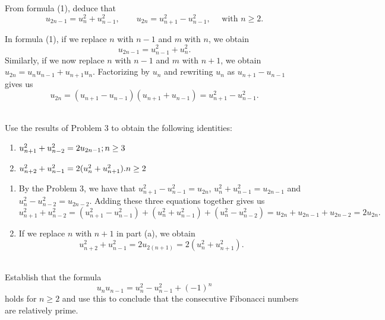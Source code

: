 \begin{exercise}
    From formula (1), deduce that
    $$u_{2n - 1} = u_n^2 + u_{n-1}^2, \qquad u_{2n} = u_{n+1}^2 - u_{n-1}^2, \quad \text{ with } n\geq 2.$$
\end{exercise}

\begin{solution}
    In formula (1), if we replace $n$ with $n-1$ and $m$ with $n$, we obtain 
    $$u_{2n - 1} = u_{n-1}^2 + u_n^2.$$
    Similarly, if we now replace $n$ with $n - 1$ and $m$ with $n +1$, we obtain
    $u_{2n} = u_nu_{n-1} + u_{n + 1}u_n$. Factorizing by $u_n$ and rewriting $u_n$ as $u_{n+1} - u_{n-1}$ gives us
    $$u_{2n} = (u_{n+1} - u_{n-1})(u_{n+1} + u_{n-1}) = u_{n+1}^2 - u_{n-1}^2.$$ \\
\end{solution}

\begin{exercise}
    Use the results of Problem 3 to obtain the following identities:
    \begin{enumerate}
        \item $u_{n+1}^2 + u_{n-2}^2 = 2u_{2n-1}; \hfill n \geq 3$
        \item $u_{n+2}^2 + u_{n-1}^2 = 2(u_n^2 + u_{n+1}^2). \hfill n \geq 2$\\
    \end{enumerate} 
\end{exercise}

\begin{solution}
    \begin{enumerate}
        \item By the Problem 3, we have that $u_{n+1}^2 - u_{n-1}^2 = u_{2n}$, $u_n^2 + u_{n-1}^2 = u_{2n-1}$ and $u_n^2 - u_{n-2}^2 = u_{2n-2}$. Adding these three equations together gives us
        $$u_{n+1}^2 + u_{n-2}^2 = (u_{n+1}^2 - u_{n-1}^2) + (u_n^2 + u_{n-1}^2) + (u_n^2 - u_{n-2}^2) = u_{2n} + u_{2n-1} + u_{2n-2} = 2u_{2n}.$$
        \item If we replace $n$ with $n + 1$ in part (a), we obtain
        $$u_{n+2}^2 + u_{n-1}^2 = 2u_{2(n+1)} = 2(u_n^2 + u_{n+1}^2).$$ \\
    \end{enumerate}
\end{solution}

\begin{exercise}
    Establish that the formula
    $$u_nu_{n-1} = u_n^2 - u_{n-1}^2 + (-1)^n$$
    holds for $n \geq 2$ and use this to conclude that the consecutive Fibonacci numbers are relatively prime. \\
\end{exercise}

